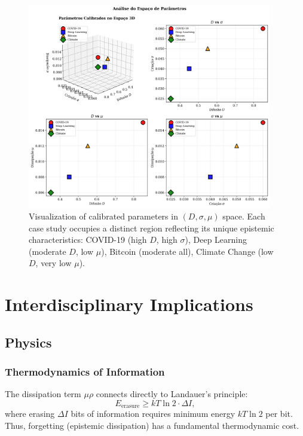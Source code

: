 \documentclass[12pt]{article}
\begin{document}
\begin{figure}[h]
    \centering
    \includegraphics[width=0.95\textwidth]{figures/parameter_space.png}
    \caption{Visualization of calibrated parameters in $(D, \sigma, \mu)$ space. Each case study occupies a distinct region reflecting its unique epistemic characteristics: COVID-19 (high $D$, high $\sigma$), Deep Learning (moderate $D$, low $\mu$), Bitcoin (moderate all), Climate Change (low $D$, very low $\mu$).}
    \label{fig:parameters}
\end{figure}

\section{Interdisciplinary Implications}

\subsection{Physics}

\subsubsection{Thermodynamics of Information}

The dissipation term $\mu\rho$ connects directly to Landauer's principle\cite{Landauer1961}:
\begin{equation}
    E_{\text{erasure}} \geq kT \ln 2 \cdot \Delta I,
\end{equation}
where erasing $\Delta I$ bits of information requires minimum energy $kT\ln 2$ per bit. Thus, forgetting (epistemic dissipation) has a fundamental thermodynamic cost.
\end{document}
